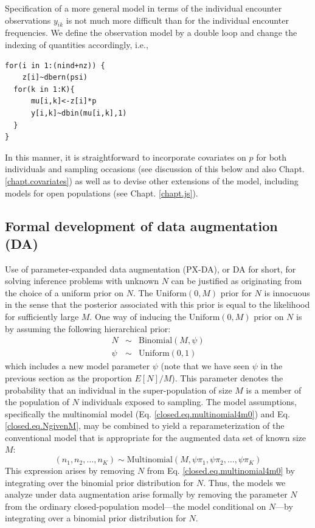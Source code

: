 Specification of a more general model in terms of the individual
encounter observations $y_{ik}$ is not much more difficult than for
the individual encounter frequencies.  We define the
observation model by a double loop and change the indexing of quantities
accordingly, i.e.,
{\small
\begin{verbatim}
for(i in 1:(nind+nz)) {
    z[i]~dbern(psi)
  for(k in 1:K){
      mu[i,k]<-z[i]*p
      y[i,k]~dbin(mu[i,k],1)
  }
}
\end{verbatim}
}
In this manner, it is straightforward to incorporate covariates on $p$
for both individuals and sampling occasions
(see discussion of this below and also Chapt. \ref{chapt.covariates})
as well as to devise other extensions of the model, including models
for open populations (see Chapt. \ref{chapt.js}).

\subsection{Formal development of data augmentation (DA) }

Use of parameter-expanded data augmentation (PX-DA), or DA for short, for solving inference problems with unknown $N$ can be
justified as originating from the choice of a uniform prior on $N$.  The
$\mathrm{Uniform}(0,M)$ prior for $N$ is innocuous in the sense that the
posterior associated with this prior is equal to the likelihood for
sufficiently large $M$.  One way of inducing the $\mathrm{Uniform}(0,M)$
prior on $N$ is by assuming the following hierarchical prior:
\begin{eqnarray}
\label{closed.eq.NgivenM}
  N &\sim& \mathrm{Binomial}(M, \psi) \\ \nonumber
  \psi &\sim& \mathrm{Uniform}(0,1)
\end{eqnarray}
which includes a new model parameter $\psi$
(note that we have seen $\psi$ in the previous section as the proportion $E[N]/M$).
This parameter denotes
the probability that an individual in the super-population of size $M$
is a member of the population of $N$ individuals exposed to sampling.
The model assumptions, specifically the multinomial model
(Eq. \ref{closed.eq.multinomial4m0})
and Eq. \ref{closed.eq.NgivenM}, may be combined to yield a
reparameterization of the conventional model that is appropriate for
the augmented data set of known size $M$:
\begin{equation}
\label{closed.eq.multinomial4DA}
    (n_1, n_2, \ldots, n_K) \sim \mathrm{Multinomial}(M, \psi  \pi_{1}, \psi \pi_{2}, \ldots, \psi \pi_{K})
\end{equation}
This expression arises by removing $N$ from Eq. \ref{closed.eq.multinomial4m0} by
integrating
over the binomial prior distribution for $N$. Thus, the models we
analyze under data augmentation arise formally by removing the
parameter $N$ from the ordinary closed-population model---the model
conditional on $N$---by integrating over a binomial prior distribution
for $N$.


